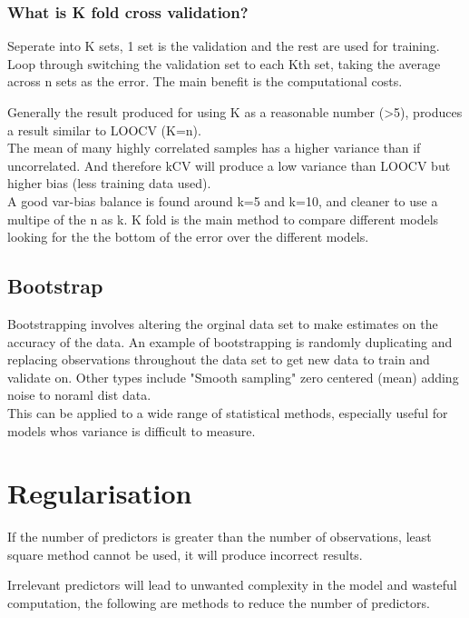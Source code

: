 \documentclass[11pt]{scrartcl} %
\begin{document}
\subsubsection{What is K fold cross validation?}

Seperate into K sets, 1 set is the validation and the rest are used for training. Loop through switching
the validation set to each Kth set, taking the average across n sets as the error. 
The main benefit is the computational costs.

Generally the result produced for using K as a reasonable number (>5), produces a result similar to
LOOCV (K=n).\\

The mean of many highly correlated samples has a higher variance than if uncorrelated. And therefore
kCV will produce a low variance than LOOCV but higher bias (less training data used).\\

A good var-bias balance is found around k=5 and k=10, and cleaner to use a multipe of the n as k.
K fold is the main method to compare different models looking for the the bottom of the error over the
different models.

\subsection{Bootstrap}

Bootstrapping involves altering the orginal data set to make estimates on the accuracy of the data.
An example of bootstrapping is randomly duplicating and replacing observations throughout the data set
to get new data to train and validate on. Other types include "Smooth sampling" zero centered (mean) 
adding noise to noraml dist data. \\

This can be applied to a wide range of statistical methods, especially useful for models whos variance
is difficult to measure.

\section{Regularisation}

If the number of predictors is greater than the number of observations, least square method cannot be 
used, it will produce incorrect results.

Irrelevant predictors will lead to unwanted complexity in the model and wasteful computation, the following are methods
to reduce the number of predictors.\\
\end{document}
